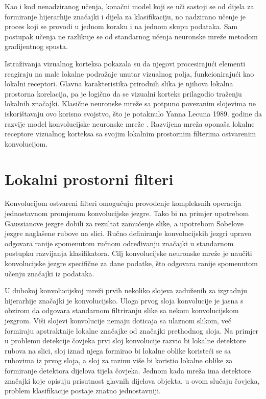 \documentclass[lmodern, utf8, diplomski, numeric]{fer}
\begin{document}
Kao i kod nenadziranog učenja, konačni model koji se uči sastoji se od dijela za formiranje hijerarhije značajki i dijela za klasifikaciju, no nadzirano učenje je proces koji se provodi u jednom koraku i na jednom skupu podataka. Sam postupak učenja ne razlikuje se od standarnog učenja neuronske mreže metodom gradijentnog spusta.

Istraživanja vizualnog korteksa pokazala su da njegovi procesirajući elementi reagiraju na male lokalne podražaje unutar vizualnog polja, funkcionirajući kao lokalni receptori. Glavna karakteristika prirodnih slika je njihova lokalna prostorna korelacija, pa je logično da se vizualni korteks prilagodio traženju lokalnih značajki.
Klasične neuronske mreže sa potpuno povezanim slojevima ne iskorištavaju ovo korisno svojstvo, što je potaknulo Yanna Lecuna 1989. godine da razvije model konvolucijske neuronske mreže \cite{lecun1998lenet}. Razvijena mreža oponaša lokalne receptore vizualnog korteksa sa svojim lokalnim prostornim filterima ostvarenim konvolucijom.

\section{Lokalni prostorni filteri}

Konvolucijom ostvareni filteri omogućuju provođenje kompleksnih operacija jednostavnom promjenom konvolucijske jezgre. Tako bi na primjer upotrebom Gaussianove jezgre dobili za rezultat zamućenje slike, a upotrebom Sobelove jezgre \cite{sobel1968operator} naglašene rubove na slici. Ručno definiranje konvolucijskih jezgri upravo odgovara ranije spomenutom ručnom određivanju značajki u standarnom postupku razvijanja klasifikatora. Cilj konvolucijske neuronske mreže je naučiti konvolucijske jezgre specifične za dane podatke, što odgovara ranije spomenutom učenju značajki iz podataka.

U dubokoj konvolucijskoj mreži prvih nekoliko slojeva zaduženih za izgradnju hijerarhije značajki je konvolucijsko. Uloga prvog sloja konvolucije je jasna s obzirom da odgovara standarnom filtriranju slike sa nekom konvolucijskom jezgrom. Viši slojevi konvolucije nemaju doticaja sa ulaznom slikom, već formiraju apstraktnije lokalne značajke od značajki prethodnog sloja. Na primjer u problemu detekcije čovjeka prvi sloj konvolucije razvio bi lokalne detektore rubova na slici, sloj iznad njega formirao bi lokalne oblike koristeći se sa rubovima iz prvog sloja, a sloj za razinu više bi koristio lokalne oblike za formiranje detektora dijelova tijela čovjeka. Jednom kada mreža ima detektore značajki koje opisuju prisutnost glavnih dijelova objekta, u ovom slučaju čovjeka, problem klasifikacije postaje znatno jednostavniji.
\end{document}
